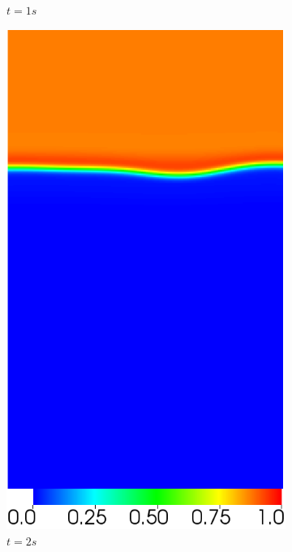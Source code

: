 \begin{figure}[H]
\begin{subfigure}[ht!]{0.2\textwidth}
		\caption{$t=1s$}
	\end{subfigure}
	\begin{subfigure}[ht!]{0.2\textwidth}
		\centering
		\includegraphics[width=1\textwidth]{figure/PT_RT/concent1/visit0001.png}
		\caption{$t=2s$}
	\end{subfigure}
	\begin{subfigure}[ht!]{0.2\textwidth}
		\centering

\end{subfigure}
\end{figure}
